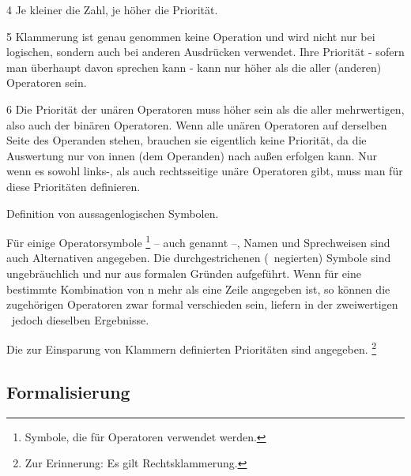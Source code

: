 \begin{table}
\begin{threeparttable}
\begin{tablenotes}
			\item[4] Je kleiner die Zahl, je höher die Priorität.
			\item[5] Klammerung ist genau genommen keine Operation und wird nicht nur bei logischen, sondern auch bei anderen Ausdrücken verwendet. Ihre Priorität - sofern man überhaupt davon sprechen kann - kann nur höher als die aller (anderen) Operatoren sein.
			\item[6] Die Priorität der unären Operatoren muss höher sein als die aller mehrwertigen, also auch der binären Operatoren.
			Wenn alle unären Operatoren auf derselben Seite des Operanden stehen, brauchen sie eigentlich keine Priorität, da die Auswertung nur von innen (dem Operanden) nach außen erfolgen kann.
			Nur wenn es sowohl links-, als auch rechtsseitige unäre Operatoren gibt, muss man für diese Prioritäten definieren.
		\end{tablenotes}
	\end{threeparttable}
	\caption{Definition von aussagenlogischen Symbolen.}
	\label{tab:Symbole}%
\end{table}

Für einige Operatorsymbole%
\footnote{Symbole, die für Operatoren verwendet werden.}
-- auch  genannt --, Namen und Sprechweisen sind auch Alternativen angegeben.
Die durchgestrichenen (\textdh\ negierten) Symbole sind ungebräuchlich und nur aus formalen Gründen aufgeführt.
Wenn für eine bestimmte Kombination von n mehr als eine Zeile angegeben ist, so können die zugehörigen Operatoren zwar formal verschieden sein, liefern in der zweiwertigen \Aussagenlogik\ jedoch dieselben Ergebnisse.

Die zur Einsparung von Klammern definierten Prioritäten sind  angegeben.%
\footnote{Zur Erinnerung: Es gilt Rechtsklammerung. }

\subsection{Formalisierung}%
\label{sub:Formalisierung}

